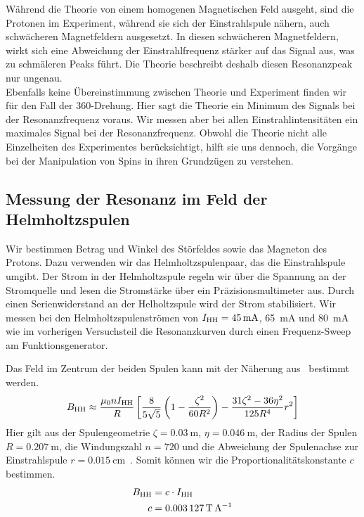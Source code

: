 \documentclass[paper=a4,
	fontsize=10pt,
	DIV=18,
	twocolumn,
	parskip=half
	]{scrartcl}
\numberwithin{equation}{section}    %
\begin{document}
Während die Theorie von einem homogenen Magnetischen Feld ausgeht, sind die Protonen im Experiment, während sie sich der Einstrahlspule nähern, auch schwächeren Magnetfeldern ausgesetzt. 
In diesen schwächeren Magnetfeldern, wirkt sich eine Abweichung der Einstrahlfrequenz stärker auf das Signal aus, was zu schmäleren Peaks führt.
Die Theorie beschreibt deshalb diesen Resonanzpeak nur ungenau.\\
Ebenfalls keine Übereinstimmung zwischen Theorie und Experiment finden wir für den Fall der $360$\textdegree -Drehung.
Hier sagt die Theorie ein Minimum des Signals bei der Resonanzfrequenz voraus. 
Wir messen aber bei allen Einstrahlintensitäten ein maximales Signal bei der Resonanzfrequenz.
Obwohl die Theorie nicht alle Einzelheiten des Experimentes berücksichtigt, hilft sie uns dennoch, die Vorgänge bei der Manipulation von Spins in ihren Grundzügen zu verstehen.

\subsection{Messung der Resonanz im Feld der Helmholtzspulen}
\label{auswertung6}

Wir bestimmen Betrag und Winkel des Störfeldes sowie das Magneton des Protons. Dazu verwenden wir das Helmholtzspulenpaar, das die Einstrahlspule umgibt. Der Strom in der Helmholtzspule regeln wir über die Spannung an der Stromquelle und lesen die Stromstärke über ein Präzisionsmultimeter aus. Durch einen Serienwiderstand an der Helholtzspule wird der Strom stabilisiert. Wir messen bei den Helmholtzspulenströmen von $I_{\rm HH} = \SI{45}{\milli\ampere}$, \SI{65}{\milli\ampere} und \SI{80}{\milli\ampere} wie im vorherigen Versuchsteil die Resonanzkurven durch einen Frequenz-Sweep am Funktionsgenerator. 

Das Feld im Zentrum der beiden Spulen kann mit der Näherung aus~\citet{anleitung} bestimmt werden.
\begin{equation}
	B_{\rm HH} \approx \frac{\mu_0 n I_{\rm HH}}{R} \left[ \frac{8}{5\sqrt{5}} \left( 1 - \frac{\zeta^2}{60R^2} \right) - \frac{31\zeta^2 - 36\eta^2}{125 R^4}r^2\right]
\end{equation}
Hier gilt aus der Spulengeometrie $\zeta=\SI{0.03}{\meter}$, $\eta=\SI{0.046}{\meter}$, der Radius der Spulen $R=\SI{0.207}{\meter}$, die Windungszahl $n=720$ und die Abweichung der Spulenachse zur Einstrahlspule $r=\SI{0.015}{\centi\meter}$~\citep{anleitung}. Somit können wir die Proportionalitätskonstante $c$ bestimmen.
\begin{align}
	B_{\rm HH} &= c\cdot I_{\rm HH}\\
	c &= \SI{0.003127}{\tesla\per\ampere}
\end{align}
\end{document}
